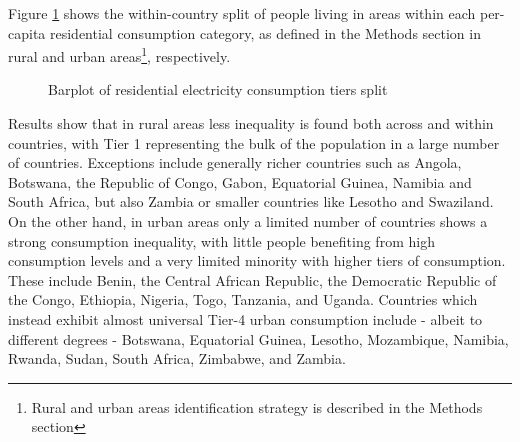 \documentclass[preprint,12pt]{elsarticle}
\begin{document}
Figure \ref{residential consumption_inequality} shows the within-country split of people living in areas within each per-capita residential consumption category, as defined in the Methods section in rural and urban areas\footnote{Rural and urban areas identification strategy is described in the Methods section}, respectively.

\begin{figure}[H]
    \label{residential consumption_inequality}
    \centering
    \qquad
    \caption{Barplot of residential electricity consumption tiers split}
\end{figure}

Results show that in rural areas less inequality is found both across and within countries, with Tier 1 representing the bulk of the population in a large number of countries. Exceptions include generally richer countries such as Angola, Botswana, the Republic of Congo, Gabon, Equatorial Guinea, Namibia and South Africa, but also Zambia  or smaller countries like Lesotho and Swaziland. On the other hand, in urban areas only a limited number of countries shows a strong consumption inequality, with little people benefiting from high consumption levels and a very limited minority with higher tiers of consumption. These include Benin, the Central African Republic, the Democratic Republic of the Congo, Ethiopia, Nigeria, Togo, Tanzania, and Uganda. Countries which instead exhibit almost universal Tier-4 urban consumption include - albeit to different degrees - Botswana, Equatorial Guinea, Lesotho, Mozambique, Namibia, Rwanda, Sudan, South Africa, Zimbabwe, and Zambia. 
\end{document}
